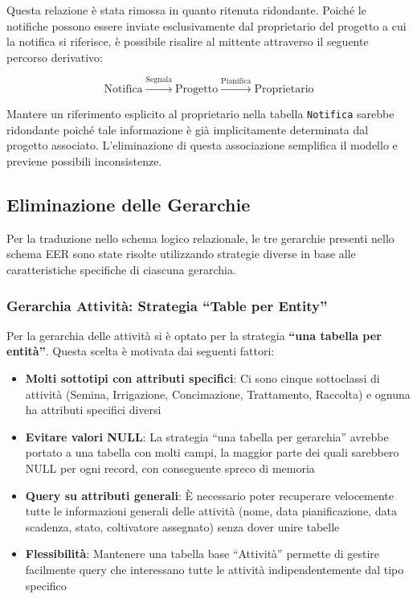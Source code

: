 \documentclass[12pt,a4paper]{article}
\begin{document}
Questa relazione è stata rimossa in quanto ritenuta ridondante. Poiché le notifiche possono essere inviate esclusivamente dal proprietario del progetto a cui la notifica si riferisce, è possibile risalire al mittente attraverso il seguente percorso derivativo:

$$\text{Notifica} \xrightarrow{\text{Segnala}} \text{Progetto} \xrightarrow{\text{Pianifica}} \text{Proprietario}$$

Mantere un riferimento esplicito al proprietario nella tabella \texttt{Notifica} sarebbe ridondante poiché tale informazione è già implicitamente determinata dal progetto associato. L'eliminazione di questa associazione semplifica il modello e previene possibili inconsistenze.

\subsection{Eliminazione delle Gerarchie}

Per la traduzione nello schema logico relazionale, le tre gerarchie presenti nello schema EER sono state risolte utilizzando strategie diverse in base alle caratteristiche specifiche di ciascuna gerarchia.

\subsubsection{Gerarchia Attività: Strategia ``Table per Entity''}

Per la gerarchia delle attività si è optato per la strategia \textbf{``una tabella per entità''}. Questa scelta è motivata dai seguenti fattori:

\begin{itemize}
    \item \textbf{Molti sottotipi con attributi specifici}: Ci sono cinque sottoclassi di attività (Semina, Irrigazione, Concimazione, Trattamento, Raccolta) e ognuna ha attributi specifici diversi
    \item \textbf{Evitare valori NULL}: La strategia ``una tabella per gerarchia'' avrebbe portato a una tabella con molti campi, la maggior parte dei quali sarebbero NULL per ogni record, con conseguente spreco di memoria
    \item \textbf{Query su attributi generali}: È necessario poter recuperare velocemente tutte le informazioni generali delle attività (nome, data pianificazione, data scadenza, stato, coltivatore assegnato) senza dover unire tabelle
    \item \textbf{Flessibilità}: Mantenere una tabella base ``Attività'' permette di gestire facilmente query che interessano tutte le attività indipendentemente dal tipo specifico
\end{itemize}
\end{document}
